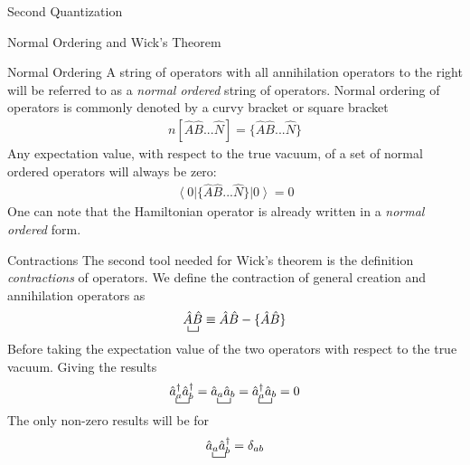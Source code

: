 \documentclass[twoside,english]{uiofysmaster}
\begin{document}
\begin{chapter}{Second Quantization}
\begin{section}{Normal Ordering and Wick's Theorem}
\begin{subsection}{Normal Ordering}
			A string of operators with all annihilation operators to the right will be referred to as a \textit{normal ordered} string of operators. Normal ordering of operators is commonly denoted by a curvy bracket or square bracket
			\begin{align}
				n[ \hat A \hat B ... \hat N ] = \{ \hat A \hat B ... \hat N \}
			\end{align}
			Any expectation value, with respect to the true vacuum, of a set of normal ordered operators will always be zero:
			\begin{align}
				\left< 0 \right| \{ \hat A \hat B ... \hat N \} \left| 0 \right> = 0 
				\label{NormalOrdering1}
			\end{align}
			One can note that the Hamiltonian operator is already written in a \textit{normal ordered} form. 
		\end{subsection}

		\begin{subsection}{Contractions}
			The second tool needed for Wick's theorem is the definition \textit{contractions} of operators. We define the contraction of general creation and annihilation operators as
			\begin{align}
				\bcontraction{}{\hat A}{}{\hat B} 
				\hat A \hat B
				\equiv \hat A \hat B - \{ \hat A \hat B \}
			\end{align}
			Before taking the expectation value of the two operators with respect to the true vacuum. 
			Giving the results
			\begin{align}
				\bcontraction{}{\hat a_a^\dagger}{}{\hat a_b^\dagger}
				\hat a_a^\dagger \hat a_b^\dagger 
				= 
				\bcontraction{}{\hat a_a}{}{\hat a_b}
				\hat a_a \hat a_b
				= 
				\bcontraction{}{\hat a_a^\dagger}{}{\hat a_b}
				\hat a_a^\dagger \hat a_b
				= 0 
			\end{align}
			The only non-zero results will be for 
			\begin{align}
				\bcontraction{}{\hat a_a}{}{\hat a_b}
				\hat a_a \hat a_b
				^\dagger = \delta_{ab}
			\end{align}
		\end{subsection}
	

\end{section}
\end{chapter}
\end{document}
